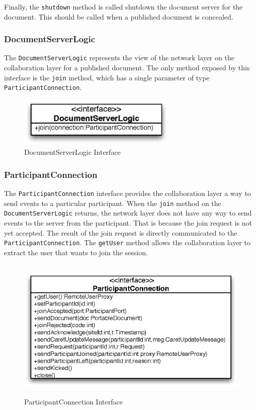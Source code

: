 Finally, the \texttt{shutdown} method is called shutdown the document
server for the document. This should be called when a published document
is concealed.

\subsubsection{DocumentServerLogic}
The \texttt{DocumentServerLogic} represents the view of the network layer
on the collaboration layer for a published document. The only method
exposed by this interface is the \texttt{join} method, which has a single
parameter of type \texttt{ParticipantConnection}.

\begin{figure}[H]
 \centering
 \includegraphics[width=7.62cm,height=2.40cm]{../images/finalreport/architecture_documentserverlogic_uml.eps}
 \caption{DocumentServerLogic Interface}
\end{figure}

\subsubsection{ParticipantConnection}
The \texttt{ParticipantConnection} interface provides the collaboration layer
a way to send events to a particular participant. When the \texttt{join}
method on the \texttt{DocumentServerLogic} returns, the network layer does
not have any way to send events to the server from the participant. That
is because the join request is not yet accepted. The result of the join
request is directly communicated to the \texttt{ParticipantConnection}.
The \texttt{getUser} method allows the collaboration layer to extract the
user that wants to join the session.

\begin{figure}[H]
 \centering
 \includegraphics[width=12.59cm,height=6.84cm]{../images/finalreport/architecture_participantconnection_uml.eps}
 \caption{ParticipantConnection Interface}
\end{figure}

